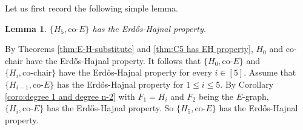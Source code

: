 \documentclass[a4paper,11pt]{article}
\newtheorem{lemma}[theorem]{Lemma}
\let\oldendproof\endproof
\renewenvironment{proof}[1][\proofname]{%
	\oldproof[\normalfont\bfseries #1]%
}{\oldendproof}
\begin{document}
    Let us first record the following simple lemma. 
    \begin{lemma}\label{lem:new EH}
        $\{H_5, \text{co-}E\}$ has the Erd\H{o}s-Hajnal property. 
    \end{lemma}
    
    \begin{proof}
        By Theorems \ref{thm:E-H-substitute} and \ref{thm:C5 has EH property}, $H_0$ and co-chair have the Erd\H{o}s-Hajnal property. 
        It follows that $\{H_0,\text{co-}E\}$ and $\{H_i,\text{co-chair}\}$ have the Erd\H{o}s-Hajnal property for every $i\in [5]$. 
        Assume that $\{H_{i-1},\text{co-}E\}$ has the Erd\H{o}s-Hajnal property for $1\leq i\leq 5$. 
        By Corollary \ref{coro:degree 1 and degree n-2} with $F_1=H_i$ and $F_2$ being the $E$-graph, $\{H_i, \text{co-}E\}$ has the Erd\H{o}s-Hajnal property.  
        So $\{H_5, \text{co-}E\}$ has the Erd\H{o}s-Hajnal property. 
    \end{proof}
\end{document}
